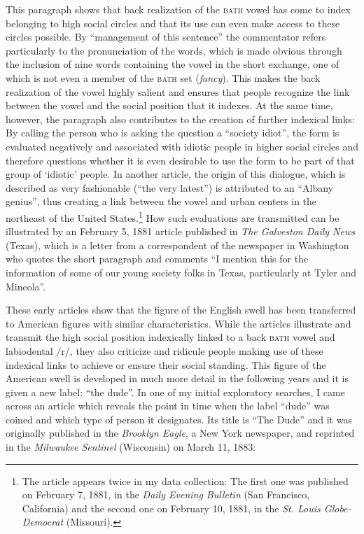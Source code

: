 This paragraph shows that back realization of the \textsc{bath} vowel has come to index belonging to high social circles and that its use can even make access to these circles possible. By “management of this sentence” the commentator refers particularly to the pronunciation of the words, which is made obvious through the inclusion of nine words containing the vowel in the short exchange, one of which is not even a member of the \textsc{bath} set (\textit{fancy}). This makes the back realization of the vowel highly salient and ensures that people recognize the link between the vowel and the social position that it indexes. At the same time, however, the paragraph also contributes to the creation of further indexical links: By calling the person who is asking the question a “society idiot”, the form is evaluated negatively and associated with idiotic people in higher social circles and therefore questions whether it is even desirable to use the form to be part of that group of ‘idiotic’ people. In another article, the origin of this dialogue, which is described as very fashionable (“the very latest”) is attributed to an “Albany genius”, thus creating a link between the vowel and urban centers in the northeast of the United States.\footnote{The article appears twice in my data collection: The first one was published on February 7, 1881, in the \emph{Daily Evening Bulletin} (San Francisco, California) and the second one on February 10, 1881, in the \emph{St. Louis Globe-Democrat} (Missouri).} How such evaluations are transmitted can be illustrated by an February 5, 1881 article published in \emph{The Galveston Daily News} (Texas), which is a letter from a correspondent of the newspaper in Washington who quotes the short paragraph and comments “I mention this for the information of some of our young society folks in Texas, particularly at Tyler and Mineola”.


These early articles show that the figure of the English swell has been transferred to American figures with similar characteristics. While the articles illustrate and transmit the high social position indexically linked to a back \textsc{bath} vowel and labiodental /r/, they also criticize and ridicule people making use of these indexical links to achieve or ensure their social standing. This figure of the American swell is developed in much more detail in the following years and it is given a new label: “the dude”. In one of my initial exploratory searches, I came across an article which reveals the point in time when the label “dude” was coined and which type of person it designates. Its title is “The Dude” and it was originally published in the \emph{Brooklyn Eagle}, a New York newspaper, and reprinted in the \emph{Milwaukee Sentinel} (Wisconsin) on March 11, 1883:

